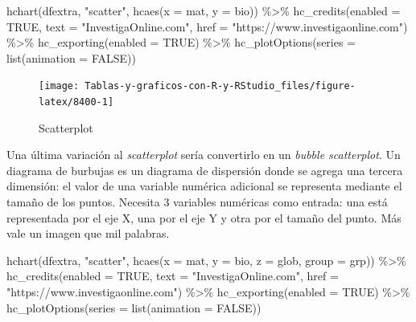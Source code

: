 \documentclass[
]{book}
\newenvironment{Shaded}{\begin{snugshade}}{\end{snugshade}}
\newcommand{\AttributeTok}[1]{\textcolor[rgb]{0.77,0.63,0.00}{#1}}
\newcommand{\ConstantTok}[1]{\textcolor[rgb]{0.00,0.00,0.00}{#1}}
\newcommand{\FunctionTok}[1]{\textcolor[rgb]{0.00,0.00,0.00}{#1}}
\newcommand{\NormalTok}[1]{#1}
\newcommand{\SpecialCharTok}[1]{\textcolor[rgb]{0.00,0.00,0.00}{#1}}
\newcommand{\StringTok}[1]{\textcolor[rgb]{0.31,0.60,0.02}{#1}}
\begin{document}
\begin{Shaded}
\begin{Highlighting}[]
\FunctionTok{hchart}\NormalTok{(dfextra, }\StringTok{"scatter"}\NormalTok{, }\FunctionTok{hcaes}\NormalTok{(}\AttributeTok{x =}\NormalTok{ mat, }\AttributeTok{y =}\NormalTok{ bio)) }\SpecialCharTok{\%\textgreater{}\%}
  \FunctionTok{hc\_credits}\NormalTok{(}\AttributeTok{enabled =} \ConstantTok{TRUE}\NormalTok{, }\AttributeTok{text =} \StringTok{"InvestigaOnline.com"}\NormalTok{,}
    \AttributeTok{href =} \StringTok{"https://www.investigaonline.com"}\NormalTok{) }\SpecialCharTok{\%\textgreater{}\%}
  \FunctionTok{hc\_exporting}\NormalTok{(}\AttributeTok{enabled =} \ConstantTok{TRUE}\NormalTok{) }\SpecialCharTok{\%\textgreater{}\%}
  \FunctionTok{hc\_plotOptions}\NormalTok{(}\AttributeTok{series =} \FunctionTok{list}\NormalTok{(}\AttributeTok{animation =} \ConstantTok{FALSE}\NormalTok{))}
\end{Highlighting}
\end{Shaded}

\begin{figure}[H]

{\centering \texttt{[image: Tablas-y-graficos-con-R-y-RStudio\_files/figure-latex/8400-1]} 

}

\caption{Scatterplot}\label{fig:8400}
\end{figure}

Una última variación al \emph{scatterplot} sería convertirlo en un \emph{bubble scatterplot}. Un diagrama de burbujas es un diagrama de dispersión donde se agrega una tercera dimensión: el valor de una variable numérica adicional se representa mediante el tamaño de los puntos. Necesita 3 variables numéricas como entrada: una está representada por el eje X, una por el eje Y y otra por el tamaño del punto. Más vale un imagen que mil palabras.

\begin{Shaded}
\begin{Highlighting}[]
\FunctionTok{hchart}\NormalTok{(dfextra, }\StringTok{"scatter"}\NormalTok{, }\FunctionTok{hcaes}\NormalTok{(}\AttributeTok{x =}\NormalTok{ mat, }\AttributeTok{y =}\NormalTok{ bio, }\AttributeTok{z =}\NormalTok{ glob,}
  \AttributeTok{group =}\NormalTok{ grp)) }\SpecialCharTok{\%\textgreater{}\%}
  \FunctionTok{hc\_credits}\NormalTok{(}\AttributeTok{enabled =} \ConstantTok{TRUE}\NormalTok{, }\AttributeTok{text =} \StringTok{"InvestigaOnline.com"}\NormalTok{,}
    \AttributeTok{href =} \StringTok{"https://www.investigaonline.com"}\NormalTok{) }\SpecialCharTok{\%\textgreater{}\%}
  \FunctionTok{hc\_exporting}\NormalTok{(}\AttributeTok{enabled =} \ConstantTok{TRUE}\NormalTok{) }\SpecialCharTok{\%\textgreater{}\%}
  \FunctionTok{hc\_plotOptions}\NormalTok{(}\AttributeTok{series =} \FunctionTok{list}\NormalTok{(}\AttributeTok{animation =} \ConstantTok{FALSE}\NormalTok{))}
\end{Highlighting}
\end{Shaded}
\end{document}
